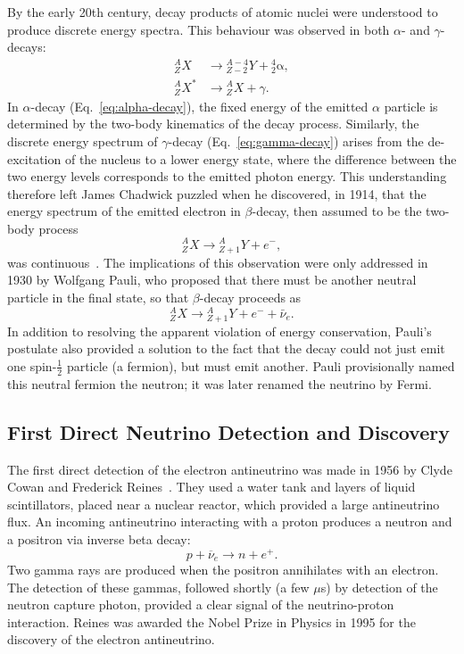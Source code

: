 By the early 20th century, decay products of atomic nuclei were understood to produce discrete energy spectra. 
This behaviour was observed in both $\alpha$- and $\gamma$-decays:
\begin{align}
    {}^{A}_{Z}X &\rightarrow {}^{A-4}_{Z-2}Y + {}^{4}_{2}\mathrm{\alpha},
    \label{eq:alpha-decay} \\
    {}^{A}_{Z}X^{*} &\rightarrow {}^{A}_{Z}X + \gamma.
    \label{eq:gamma-decay}
\end{align}
In $\alpha$-decay (Eq.~\ref{eq:alpha-decay}), the fixed energy of the emitted $\alpha$ particle is determined by the two-body kinematics of the decay process.
Similarly, the discrete energy spectrum of $\gamma$-decay (Eq.~\ref{eq:gamma-decay}) arises from the de-excitation of the nucleus to a lower energy state, where the difference between the two energy levels corresponds to the emitted photon energy.
This understanding therefore left James Chadwick puzzled when he discovered, in 1914, that the energy spectrum of the emitted electron in $\beta$-decay, then assumed to be the two-body process
\begin{equation}
    {}^{A}_{Z}X \rightarrow {}^{A}_{Z+1}Y + e^{-},
    \label{eq:beta-decay}
\end{equation}
was continuous~\cite{Chadwick1914,Zuber2020}.
The implications of this observation were only addressed in 1930 by Wolfgang Pauli, who proposed that there must be another neutral particle in the final state, so that $\beta$-decay proceeds as
\begin{equation}
    {}^{A}_{Z}X \rightarrow {}^{A}_{Z+1}Y + e^{-} + \bar{\nu}_e.
    \label{eq:beta-decay-threebody}
\end{equation}
In addition to resolving the apparent violation of energy conservation, Pauli's postulate also provided a solution to the fact that the decay could not just emit one spin-$\frac{1}{2}$ particle (a fermion), but must emit another.
Pauli provisionally named this neutral fermion the neutron; it was later renamed the neutrino by Fermi. 

\subsection{First Direct Neutrino Detection and Discovery}
The first direct detection of the electron antineutrino was made in 1956 by Clyde Cowan and Frederick Reines~\cite{ReinesCowan1953,CowanReines1956}.
They used a water tank and layers of liquid scintillators, placed near a nuclear reactor, which provided a large antineutrino flux.
An incoming antineutrino interacting with a proton produces a neutron and a positron via inverse beta decay:
\begin{equation}
    p + \overline{\nu}_e \rightarrow n + e^{+}.
    \label{eq:inverse-beta-decay}
\end{equation}
Two gamma rays are produced when the positron annihilates with an
electron. The detection of these gammas, followed shortly (a few
$\mu$s) by detection of the neutron capture photon, provided a clear
signal of the neutrino-proton interaction.
Reines was awarded the Nobel Prize in Physics in 1995 for the discovery of the electron antineutrino.

